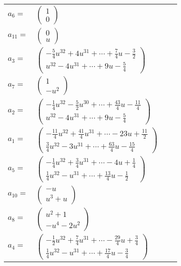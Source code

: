 \documentclass[1p]{elsarticle_modified}
\theoremstyle{definition}
\begin{document}
\begin{tabular}{m{7pt} m{180pt} m{7pt} m{180pt} }
\flushright $a_{6}=$&$\begin{pmatrix}1\\0\end{pmatrix}$ \\
\flushright $a_{11}=$&$\begin{pmatrix}0\\u\end{pmatrix}$ \\
\flushright $a_{3}=$&$\begin{pmatrix}-\frac{5}{4} u^{32}+4 u^{31}+\cdots+\frac{7}{4} u-\frac{3}{2}\\u^{32}-4 u^{31}+\cdots+9 u-\frac{5}{4}\end{pmatrix}$ \\
\flushright $a_{7}=$&$\begin{pmatrix}1\\- u^2\end{pmatrix}$ \\
\flushright $a_{2}=$&$\begin{pmatrix}-\frac{1}{4} u^{32}-\frac{5}{2} u^{30}+\cdots+\frac{43}{4} u-\frac{11}{4}\\u^{32}-4 u^{31}+\cdots+9 u-\frac{5}{4}\end{pmatrix}$ \\
\flushright $a_{1}=$&$\begin{pmatrix}-\frac{11}{4} u^{32}+\frac{41}{4} u^{31}+\cdots-23 u+\frac{11}{2}\\\frac{3}{4} u^{32}-3 u^{31}+\cdots+\frac{63}{4} u-\frac{15}{4}\end{pmatrix}$ \\
\flushright $a_{5}=$&$\begin{pmatrix}-\frac{1}{4} u^{32}+\frac{3}{4} u^{31}+\cdots-4 u+\frac{1}{4}\\\frac{1}{4} u^{32}- u^{31}+\cdots+\frac{13}{4} u-\frac{1}{2}\end{pmatrix}$ \\
\flushright $a_{10}=$&$\begin{pmatrix}- u\\u^3+u\end{pmatrix}$ \\
\flushright $a_{8}=$&$\begin{pmatrix}u^2+1\\- u^4-2 u^2\end{pmatrix}$ \\
\flushright $a_{4}=$&$\begin{pmatrix}-\frac{1}{2} u^{32}+\frac{7}{4} u^{31}+\cdots-\frac{29}{4} u+\frac{3}{4}\\\frac{1}{4} u^{32}- u^{31}+\cdots+\frac{17}{4} u-\frac{3}{4}\end{pmatrix}$ \\

\end{tabular}
\end{document}
